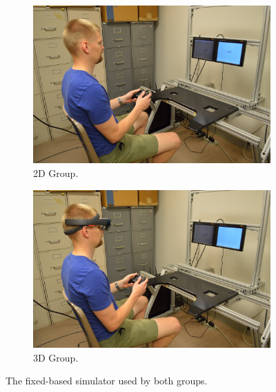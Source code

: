 \begin{figure}[t!]
    \begin{center}
        \begin{subfigure}{0.49\textwidth}
            \includegraphics[width=\linewidth]{figures/AR/DSC_0801.JPG}
            \caption[2D Group]{2D Group.}
        \end{subfigure}\hfill
        \begin{subfigure}{0.49\textwidth}
            \includegraphics[width=\linewidth]{figures/AR/DSC_0803.JPG}
            \caption[3D Group]{3D Group.}
        \end{subfigure}
        \caption[The fixed-based simulator used by both groups]{The fixed-based simulator used by both groups.}%
        \label{fig:simulator}%
    \end{center}
\end{figure}

